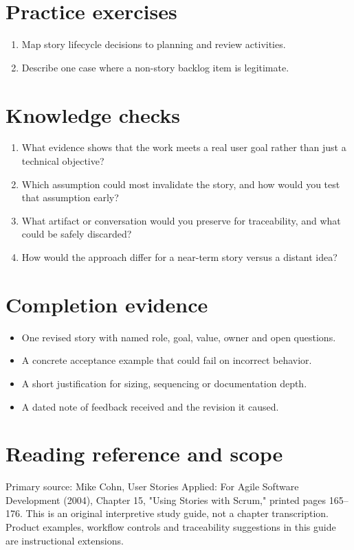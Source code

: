 \documentclass[11pt,letterpaper]{article}
\begin{document}
\section{Practice exercises}
\begin{enumerate}[leftmargin=*,itemsep=3pt]
\item Map story lifecycle decisions to planning and review activities.
\item Describe one case where a non-story backlog item is legitimate.
\end{enumerate}
\section{Knowledge checks}
\begin{enumerate}[leftmargin=*,itemsep=3pt]
\item What evidence shows that the work meets a real user goal rather than just a technical objective?
\item Which assumption could most invalidate the story, and how would you test that assumption early?
\item What artifact or conversation would you preserve for traceability, and what could be safely discarded?
\item How would the approach differ for a near-term story versus a distant idea?
\end{enumerate}
\section{Completion evidence}
\begin{itemize}[leftmargin=*,itemsep=2pt]
\item One revised story with named role, goal, value, owner and open questions.
\item A concrete acceptance example that could fail on incorrect behavior.
\item A short justification for sizing, sequencing or documentation depth.
\item A dated note of feedback received and the revision it caused.
\end{itemize}
\section{Reading reference and scope}
Primary source: Mike Cohn, User Stories Applied: For Agile Software Development (2004), Chapter 15, "Using Stories with Scrum," printed pages 165–176. This is an original interpretive study guide, not a chapter transcription. Product examples, workflow controls and traceability suggestions in this guide are instructional extensions.
\end{document}
